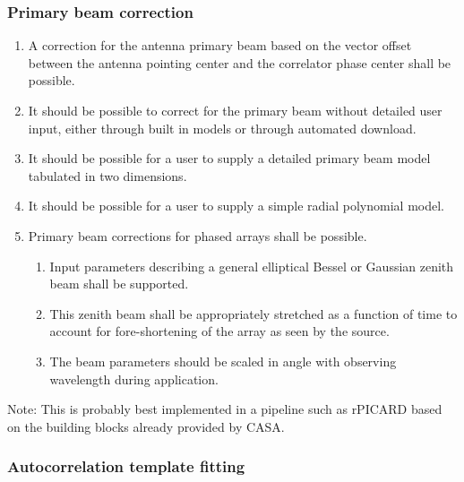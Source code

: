 \documentclass[11pt,a4paper]{article}
\begin{document}
\subsubsection{Primary beam correction}

\begin{enumerate}[subsubseclist]

\item A correction for the antenna primary beam based on the vector
  offset between the antenna pointing center and the correlator phase
  center shall be possible.

\item It should be possible to correct for the primary beam without
  detailed user input, either through built in models or through
  automated download.

\item It should be possible for a user to supply a detailed primary
  beam model tabulated in two dimensions.

\item It should be possible for a user to supply a simple radial
  polynomial model.

\item Primary beam corrections for phased arrays shall be possible.

  \begin{enumerate}[subsubsecsublist]

  \item Input parameters describing a general elliptical Bessel
    or Gaussian zenith beam shall be supported.

  \item This zenith beam shall be appropriately stretched as a
    function of time to account for fore-shortening of the array as seen by the source.

  \item The beam parameters should be scaled in angle with observing
    wavelength during application.

  \end{enumerate}

\end{enumerate}

Note: This is probably best implemented in a pipeline such as rPICARD
based on the building blocks already provided by CASA.

\subsubsection{Autocorrelation template fitting}
\end{document}

